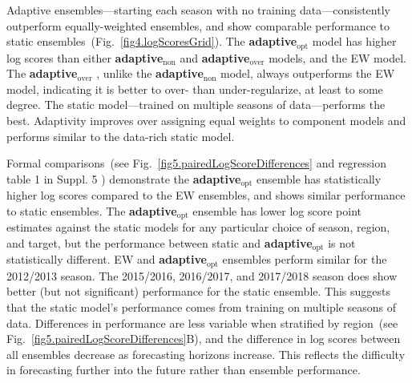\documentclass[sagev,times,Review,10pt]{sagej}
\def\adaptNon{\textbf{adaptive$_{\text{non}}$ }}
\def\adaptOpt{\textbf{adaptive$_{\text{opt}}$ }}
\def\adaptOver{\textbf{adaptive$_{\text{over}}$ }}
\begin{document}
Adaptive ensembles---starting each season with no training data---consistently outperform equally-weighted ensembles, and show comparable performance to static ensembles~(Fig.~\ref{fig4.logScoresGrid}).
The \adaptOpt model has higher log scores than either \adaptNon and \adaptOver models, and the EW model.
The \adaptOver, unlike the \adaptNon model, always outperforms the EW model, indicating it is better to over- than under-regularize, at least to some degree.
The static model---trained on multiple seasons of data---performs the best. 
Adaptivity improves over assigning equal weights to component models and performs similar to the data-rich static model. 


Formal comparisons~(see Fig.~\ref{fig5.pairedLogScoreDifferences} and regression table 1 in Suppl. 5 %
) demonstrate the \adaptOpt ensemble has statistically higher log scores compared to the EW ensembles, and shows similar performance to static ensembles.
The \adaptOpt ensemble has lower log score point estimates against the static models for any particular choice of season, region, and target, but the performance between static and \adaptOpt is not statistically different.
EW and \adaptOpt ensembles perform similar for the 2012/2013 season.
The 2015/2016, 2016/2017, and 2017/2018 season does show better (but not significant) performance for the static ensemble.
This suggests that the static model's performance comes from training on multiple seasons of data.
Differences in performance are less variable when stratified by region~(see Fig.~\ref{fig5.pairedLogScoreDifferences}B), and 
the difference in log scores between all ensembles decrease as forecasting horizons increase.
This reflects the difficulty in forecasting further into the future rather than ensemble performance.
\end{document}
